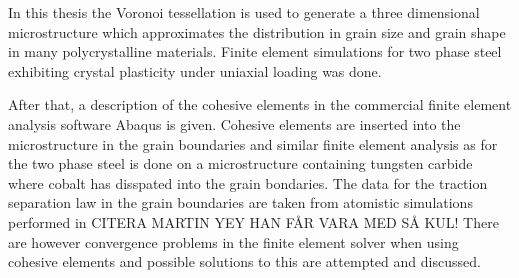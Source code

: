 \documentclass[introduction.tex]{subfiles}
\begin{document}
In this thesis the Voronoi tessellation is used to generate a three dimensional microstructure which approximates the distribution in grain size and grain shape in many polycrystalline materials. Finite element simulations for two phase steel exhibiting crystal plasticity under uniaxial loading was done.

After that, a description of the cohesive elements in the commercial finite element analysis software Abaqus is given. Cohesive elements are inserted into the microstructure in the grain boundaries and similar finite element analysis as for the two phase steel is done on a microstructure containing tungsten carbide where cobalt has disspated into the grain bondaries. The data for the traction separation law in the grain boundaries are taken from atomistic simulations performed in CITERA MARTIN YEY HAN FÅR VARA MED SÅ KUL! There are however convergence problems in the finite element solver when using cohesive elements and possible solutions to this are attempted and discussed.
\end{document}
